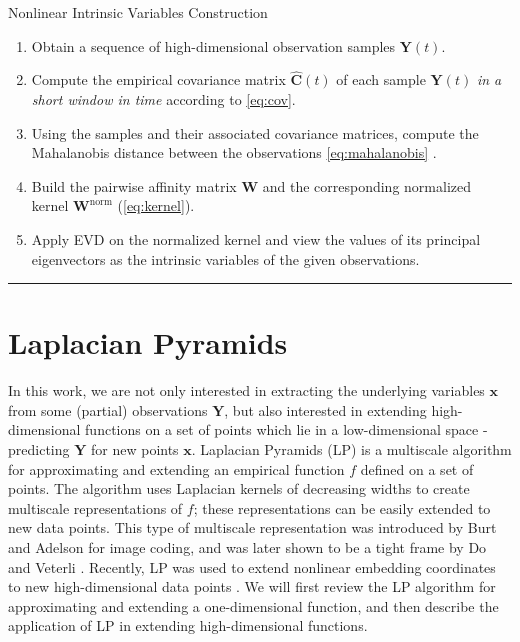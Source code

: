 \documentclass[aip,jcp,preprint]{revtex4-1}
\begin{document}
\begin{algorithm}[th!]
\caption{Nonlinear Intrinsic Variables Construction}
\begin{enumerate}

\item
Obtain a sequence of high-dimensional observation samples $\mathbf{Y}(t)$.

\item
Compute the empirical covariance matrix $\widehat{\mathbf{C}}(t)$ of each sample $\mathbf{Y}(t)$ {\em in a short window in time} according to \eqref{eq:cov}.

\item
Using the samples and their associated covariance matrices, compute the Mahalanobis distance between the observations \eqref{eq:mahalanobis} .

\item
Build the pairwise affinity matrix $\mathbf{W}$ and the corresponding normalized kernel $\mathbf{W}^{\mathrm{norm}}$ (\ref{eq:kernel}).

\item
Apply EVD on the normalized kernel and view the values of its principal eigenvectors as the intrinsic variables of the given observations.

\end{enumerate}
\hrule
\label{algo}
\end{algorithm}

\section{Laplacian Pyramids} \label{sec:LapPyr}

In this work, we are not only interested in extracting the underlying variables $\mathbf{x}$ from some (partial) observations $\mathbf{Y}$,
but also interested in extending high-dimensional functions on a set of points which lie in a low-dimensional space - predicting $\mathbf{Y}$ for new points $\mathbf{x}$.
%
Laplacian Pyramids (LP) is a multiscale algorithm for approximating and extending an empirical function $f$ defined on a set of points.
%
The algorithm uses Laplacian kernels of decreasing widths to create multiscale representations of $f$;
these representations can be easily extended to new data points.
%
This type of multiscale representation was introduced by Burt and Adelson \cite{burt1983laplacian} for image coding,
and was later shown to be a tight frame by Do and Veterli \cite{do2003framing}.
%
Recently, LP was used to extend nonlinear embedding coordinates to new high-dimensional data points \cite{rabin2012heterogeneous}.
%
We will first review the LP algorithm for approximating and extending a one-dimensional function,
and then describe the application of LP in extending high-dimensional functions.
\end{document}
